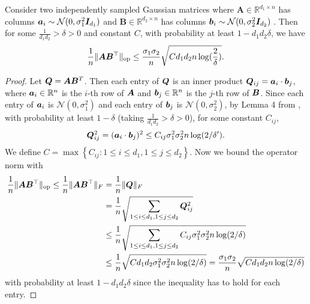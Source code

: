 \begin{lemma}\label{lemma: op_norm_bound}
Consider two independently sampled Gaussian matrices where $\mathbf{A} \in \mathbb{R}^{d_1 \times n}$ has columns ${\bm{a}}_i \sim \mathcal{N}(0, \sigma_1^2{\bm{I}}_{d_1})$ and $\mathbf{B} \in \mathbb{R}^{d_2 \times n}$ has columns ${\bm{b}}_i \sim \mathcal{N}(0, \sigma_2^2{\bm{I}}_{d_2})$ . Then for some $\frac{1}{d_1d_2} > \delta > 0$ and constant $C$, with probability at least $1- d_1d_2\delta$, we have
\[
    \frac{1}{n}\lVert {\bm{A}}{\bm{B}}^\top \rVert_{\mathrm{op}} \leq \frac{\sigma_1\sigma_2}{n}\sqrt{Cd_1d_2n\log(\frac{2}{\delta})}. 
\]
\end{lemma}
\begin{proof}
    Let ${\bm{Q}} = {\bm{A}}{\bm{B}}^T$. Then each entry of ${\bm{Q}}$ is an inner product ${\bm{Q}}_{ij} = {\bm{a}}_i \cdot {\bm{b}}_j$, where ${\bm{a}}_i \in \mathbb{R}^n$ is the $i$-th row of ${\bm{A}}$ and ${\bm{b}}_j \in \mathbb{R}^n$ is the $j$-th row of ${\bm{B}}$. Since each entry of ${\bm{a}}_i$ is $\mathcal{N}(0, \sigma_1^2)$ and each entry of ${\bm{b}}_j$ is $\mathcal{N}(0, \sigma_2^2)$, by Lemma 4 from \cite{shen2022data}, with probability at least $1- \delta$ (taking $\frac{1}{d_1d_2} > \delta > 0$), for some constant $C_{ij}$, 
    \[
        {\bm{Q}}_{ij}^2 = ({\bm{a}}_i \cdot {\bm{b}}_j)^2 \leq C_{ij}\sigma_1^2\sigma_2^2n\log(2/\delta'). 
    \]
    We define $C =  \max \left \{C_{ij}: 1 \leq i \leq d_1, 1 \leq j \leq d_2 \right\}$. Now we bound the operator norm with 
    \begin{align*}
        \frac{1}{n}\lVert {\bm{A}}{\bm{B}}^\top \rVert_{\mathrm{op}} \leq \frac{1}{n}\|{\bm{A}}{\bm{B}}^\top\|_F & = \frac{1}{n}\|{\bm{Q}}\|_F \\
        & = \frac{1}{n} \sqrt{ \sum_{1 \leq i \leq d_1, 1 \leq j \leq d_2}{{\bm{Q}}_{ij}^2}} \\
        & \leq \frac{1}{n} \sqrt{ \sum_{1 \leq i \leq d_1, 1 \leq j \leq d_2}{C_{ij}\sigma_1^2\sigma_2^2n\log(2/\delta)}} \\ 
        & \leq \frac{1}{n} \sqrt{Cd_1d_2\sigma_1^2\sigma_2^2n\log(2/\delta)} = \frac{\sigma_1\sigma_2}{n}\sqrt{Cd_1d_2n\log(2/\delta)}
    \end{align*}
    with probability at least $1-d_1d_2\delta$ since the inequality has to hold for each entry. 
\end{proof}

